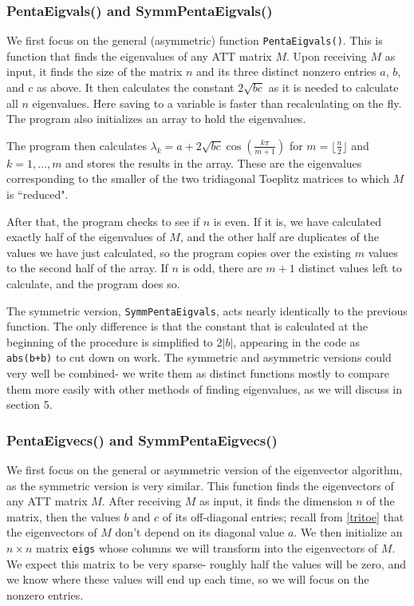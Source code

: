\documentclass[10pt,twocolumn]{article}
\begin{document}
\subsubsection{PentaEigvals() and SymmPentaEigvals()}

We first focus on the general (asymmetric) function \verb|PentaEigvals()|. This is function that finds the eigenvalues of any ATT matrix $M$. Upon receiving $M$ as input, it finds the size of the matrix $n$ and its three distinct nonzero entries $a$, $b$, and $c$ as above. It then calculates the constant $2\sqrt{bc}$ as it is needed to calculate all $n$ eigenvalues. Here saving to a variable is faster than recalculating on the fly. The program also initializes an array to hold the eigenvalues.

The program then calculates $\lambda_k=a+2\sqrt{bc}\cos(\frac{k\pi}{m+1})$ for $m=\lfloor \frac{n}{2} \rfloor$ and $k=1,\dots,m$ and stores the results in the array. These are the eigenvalues corresponding to the smaller of the two tridiagonal Toeplitz matrices to which $M$ is ``reduced". 

After that, the program checks to see if $n$ is even. If it is, we have calculated exactly half of the eigenvalues of $M$, and the other half are duplicates of the values we have just calculated, so the program copies over the existing $m$ values to the second half of the array. If $n$ is odd, there are $m+1$ distinct values left to calculate, and the program does so.

The symmetric version, \verb|SymmPentaEigvals|, acts nearly identically to the previous function. The only difference is that the constant that is calculated at the beginning of the procedure is simplified to $2|b|$, appearing in the code as \verb|abs(b+b)| to cut down on work. The symmetric and asymmetric versions could very well be combined- we write them as distinct functions mostly to compare them more easily with other methods of finding eigenvalues, as we will discuss in section 5.

\subsubsection{PentaEigvecs() and SymmPentaEigvecs()}

We first focus on the general or asymmetric version of the eigenvector algorithm, as the symmetric version is very similar. This function finds the eigenvectors of any ATT matrix $M$. After receiving $M$ as input, it finds the dimension $n$ of the matrix, then the values $b$ and $c$ of its off-diagonal entries; recall from \ref{tritoe} that the eigenvectors of $M$ don't depend on its diagonal value $a$. We then initialize an $n \times n$ matrix \verb|eigs| whose columns we will transform into the eigenvectors of $M$. We expect this matrix to be very sparse- roughly half the values will be zero, and we know where these values will end up each time, so we will focus on the nonzero entries.
\end{document}
